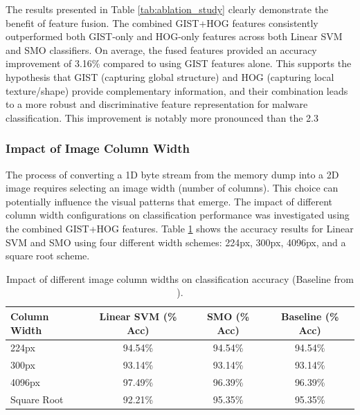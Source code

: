 The results presented in Table \ref{tab:ablation_study} clearly demonstrate the benefit of feature fusion. The combined GIST+HOG features consistently outperformed both GIST-only and HOG-only features across both Linear SVM and SMO classifiers. On average, the fused features provided an accuracy improvement of 3.16\% compared to using GIST features alone. This supports the hypothesis that GIST (capturing global structure) and HOG (capturing local texture/shape) provide complementary information, and their combination leads to a more robust and discriminative feature representation for malware classification. This improvement is notably more pronounced than the 2.3%

\subsubsection{Impact of Image Column Width}
\label{subsubsec:col_width}

The process of converting a 1D byte stream from the memory dump into a 2D image requires selecting an image width (number of columns). This choice can potentially influence the visual patterns that emerge. The impact of different column width configurations on classification performance was investigated using the combined GIST+HOG features. Table \ref{tab:col_width_impact} shows the accuracy results for Linear SVM and SMO using four different width schemes: 224px, 300px, 4096px, and a square root scheme.

\begin{table}[h!]
  \centering
  \captionsetup{labelformat=empty, textformat=simple}
  \caption{TABLE III: COLUMN WIDTH IMPACT ANALYSIS}
  \label{tab:col_width_impact}
  \begin{tabular}{lccc}
    \toprule
    \textbf{Column Width} & \textbf{Linear SVM (\% Acc)} & \textbf{SMO (\% Acc)} & \textbf{Baseline (\% Acc)} \\
    \midrule
    224px         & 94.54\% & 94.54\% & 94.54\% \\
    300px         & 93.14\% & 93.14\% & 93.14\% \\
    4096px        & 97.49\% & 96.39\% & 96.39\% \\ %
    Square Root   & 92.21\% & 95.35\% & 95.35\% \\
    \bottomrule
  \end{tabular}
    \vspace{0.2cm} %
    \caption*{Impact of different image column widths on classification accuracy (Baseline from \citep{bozkir2021catch}).} %
\end{table}

